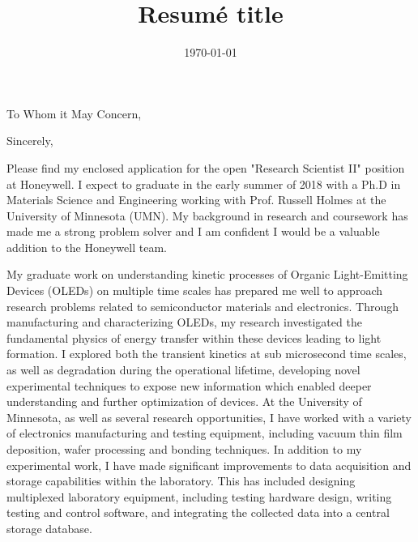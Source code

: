 \documentclass[11pt,a4paper,roman]{moderncv}        %
\title{Resumé title}                               %
\begin{document}
\date{\today}
\opening{To Whom it May Concern,}

\closing{Sincerely,}
\makelettertitle
\justify

Please find my enclosed application for the open "Research Scientist II" position at Honeywell.  
I expect to graduate in the early summer of 2018 with a  Ph.D in Materials Science and Engineering working with Prof. Russell Holmes at the University of Minnesota (UMN).  
My background in research and coursework has made me a strong problem solver and I am confident I would be a valuable addition to the Honeywell team.

My graduate work on understanding kinetic processes of Organic Light-Emitting Devices (OLEDs) on multiple time scales has prepared me well to approach research problems related to semiconductor materials and electronics.  
Through manufacturing and characterizing OLEDs, my research investigated the fundamental physics of energy transfer within these devices leading to light formation.  
I explored both the transient kinetics at sub microsecond time scales, as well as degradation during the operational lifetime, developing novel experimental techniques to expose new information which enabled deeper understanding and further optimization of devices. 
At the University of Minnesota, as well as several research opportunities, I have worked with a variety of electronics manufacturing and testing equipment, including vacuum thin film deposition, wafer processing and bonding techniques.
In addition to my experimental work, I have made significant improvements to data acquisition and storage capabilities within the laboratory.  
This has included designing multiplexed laboratory equipment, including testing hardware design, writing testing and control software, and integrating the collected data into a central storage database.  
\end{document}
